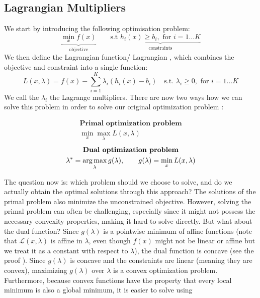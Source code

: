 \subsection{Lagrangian Multipliers}\label{lagrangian_multipliers}
We start by introducing the following optimisation problem:
$$ \underbrace{\min\limits_x f(x)}_{\text{objective}} \qquad \text{s.t } 
\underbrace{h_i(x) \geq b_i, \text{ for } i=1\dots K}_{\text{constraints}}$$
We then define the Lagrangian function/ Lagrangian , which combines the objective and constraint into a single function:
$$ L(x,\lambda) = f(x)- \underset{i=1}{\sum^K}\lambda_i(h_i(x)-b_i) \quad \text{s.t. } \lambda_i \geq 0, \text{ for } i= 1\dots K$$
We call the $\lambda_i$ the Lagrange multipliers. There are now two ways how we can solve this problem in order to solve our original 
optimization problem :
\vspace{-1.2cm}
\begin{multicols}{2}
   \begin{gather*}
      \textbf{Primal optimization problem} \\
      \min\limits_x \max\limits_\lambda L(x,\lambda) 
  \end{gather*}\break
  \begin{gather*}
      \textbf{Dual optimization problem} \\
      \lambda^* = \operatorname*{arg\,max}\limits_\lambda g(\lambda), \qquad g(\lambda)=\min\limits_x L(x,\lambda)
  \end{gather*}
\end{multicols}
The question now is: which problem should we choose to solve, and do we actually obtain the optimal solutions through 
this approach?\newline
The solutions of the primal problem also minimize the unconstrained objective. However, solving the primal problem can
often be challenging, especially since it might not possess the necessary convexity properties, making it hard to solve
directly. But what about the dual function?\newline
Since $ g(\lambda) $ is a pointwise minimum of affine functions (note that $ \mathcal{L}(x, \lambda) $ is affine in $ \lambda $,
even though $ f(x) $ might not be linear or affine but we treat it as a constant with respect to $ \lambda $), the dual function 
is concave (see the proof \cite{Proof_Lagrangian_Concave}). Since $ g(\lambda) $ is concave 
and the constraints are linear (meaning they are convex), maximizing $ g(\lambda) $ over $ \lambda $ is a convex optimization problem. 
Furthermore, because convex functions have the property that every local minimum is also a global minimum, it is easier to solve using 
